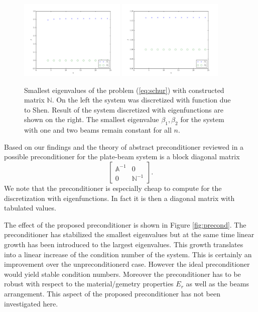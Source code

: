 \documentclass{marine_2015}
\begin{document}
 \begin{figure}[h!]
 \centering
 \includegraphics[width=0.45\textwidth]{img/Schur_precond_shen_cond}
 \includegraphics[width=0.45\textwidth]{img/Schur_precond_sine_cond}\\
 \caption{Smallest eigenvalues of the problem (\ref{eq:schur}) with constructed
 matrix $\mathbb{N}$. On the left the system was discretized with function due
 to Shen. Result of the system discretized with eigenfunctions are shown on the
 right. The smallest eigenvalue $\beta_1, \beta_2$ for the system with one and
 two beams remain constant for all $n$.}
 \label{fig:schur}
 \end{figure}
Based on our findings and the theory of abstract preconditioner reviewed in
\cite{kent} a possible preconditioner for the plate-beam system is a block
diagonal matrix
\[
    \begin{bmatrix}
      \mathbb{A}^{-1} & 0 \\
      0 & \mathbb{N}^{-1}
    \end{bmatrix}.
\]
We note that the preconditioner is especially cheap to compute for the
discretization with eigenfunctions. In fact it is then a diagonal matrix with
tabulated values.

The effect of the proposed preconditioner is shown in Figure \ref{fig:precond}.
The preconditioner has stabilized the smallest eigenvalues but at the same time 
linear growth has been introduced to the largest eigenvalues. This growth translates 
into a linear increase of the condition number of the system. This is certainly an 
improvement over the unpreconditionerd case. However the ideal preconditioner
would yield stable condition numbers. Moreover the preconditioner has to be
robust with respect to the material/gemetry properties $E_r$ as well as the
beams arrangement. This aspect of the proposed preconditioner has not been
investigated here.
\end{document}
